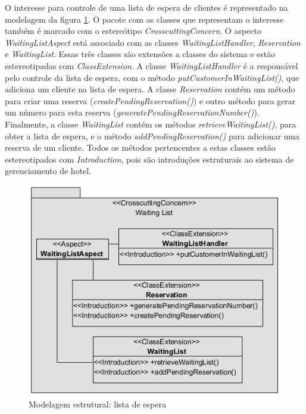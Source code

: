 O interesse para controle de uma lista de espera de clientes é representado na modelagem da figura \ref{fig:case_study_structural_waiting_list}. O
pacote com as classes que representam o interesse também é marcado com o estereótipo \textit{CrosscuttingConcern}. O aspecto \textit{WaitingListAspect} está
associado com as classes \textit{WaitingListHandler}, \textit{Reservation} e \textit{WaitingList}. Essas três classes são extensões a classes do
sistema e estão estereotipadas com \textit{ClassExtension}. A classe \textit{WaitingListHandler} é a responsável pelo controle da lista de espera, com
o método \textit{putCustomerInWaitingList()}, que adiciona um cliente na lista de espera. A classe \textit{Reservation} contém um método para criar
uma reserva (\textit{createPendingReservation()}) e outro método para gerar um número para esta reserva (\textit{generatePendingReservationNumber()}).
Finalmente, a classe \textit{WaitingList} contém os métodos \textit{retrieveWaitingList()}, para obter a lista de espera, e o método
\textit{addPendingReservation()} para adicionar uma reserva de um cliente. Todos os métodos pertencentes a estas classes estão estereotipados com
\textit{Introduction}, pois são introduções estruturais ao sistema de gerenciamento de hotel.

  \begin{figure}
	\centering
	\includegraphics{img/case_study_structural_waiting_list.png}
	\caption{Modelagem estrutural: lista de espera}\label{fig:case_study_structural_waiting_list}
  \end{figure}
  

